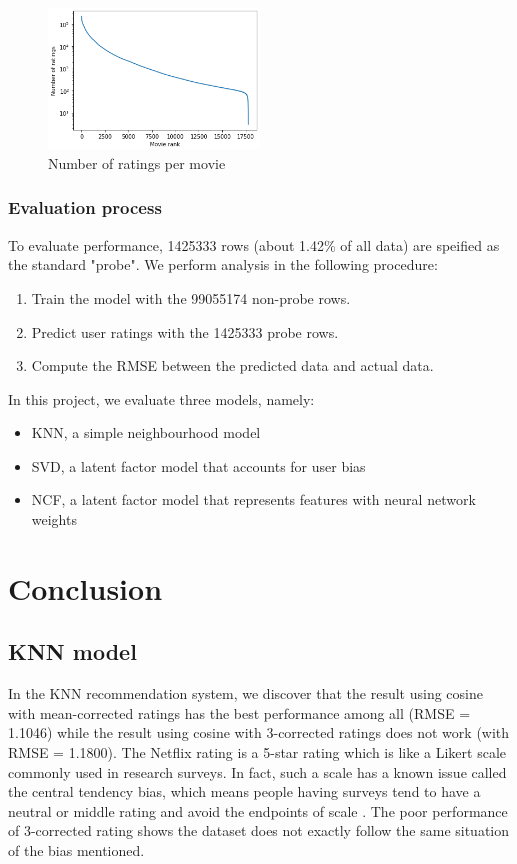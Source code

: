 \documentclass[final]{cvpr}
\begin{document}
\begin{figure}
	\includegraphics[width=0.5\textwidth]{screenshot20210422223229.png}
	\caption{Number of ratings per movie}
	\label{fig:movie-rating-freq}
\end{figure}

\subsubsection{Evaluation process}
To evaluate performance, 1425333 rows (about 1.42\% of all data) are speified as the standard "probe".
We perform analysis in the following procedure:

\begin{enumerate}
	\item Train the model with the 99055174 non-probe rows.
	\item Predict user ratings with the 1425333 probe rows.
	\item Compute the \ac{RMSE} between the predicted data and actual data.
\end{enumerate}

In this project, we evaluate three models, namely:

\begin{itemize}
	\item \ac{KNN}, a simple neighbourhood model
	\item \ac{SVD}, a latent factor model that accounts for user bias
	\item \ac{NCF}, a latent factor model that represents features with neural network weights
\end{itemize}

\section{Conclusion}

\subsection{\ac{KNN} model}
In the KNN recommendation system, we discover that the result using cosine with mean-corrected ratings has the best performance among all (RMSE = 1.1046) while the result using cosine with 3-corrected ratings does not work (with RMSE = 1.1800). The Netflix rating is a 5-star rating which is like a Likert scale commonly used in research surveys. In fact, such a scale has a known issue called the central tendency bias, which means people having surveys tend to have a neutral or middle rating and avoid the endpoints of scale \cite{stevens1971issues}. The poor performance of 3-corrected rating shows the dataset does not exactly follow the same situation of the bias mentioned.
\end{document}
